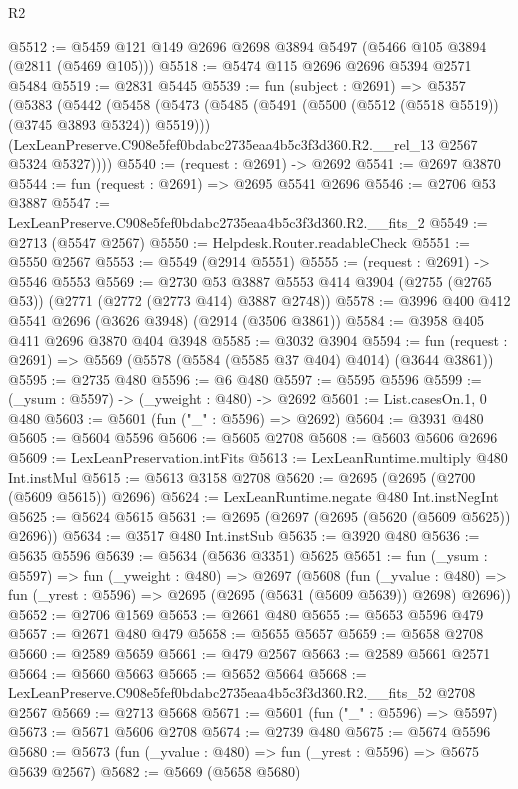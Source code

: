 \begin{lexlean}{R2}
\begin{coremodule}
@5512 := @5459 @121 @149 @2696 @2698 @3894 @5497 (@5466 @105 @3894 (@2811 (@5469 @105)))
@5518 := @5474 @115 @2696 @2696 @5394 @2571 @5484
@5519 := @2831 @5445
@5539 := fun (subject : @2691) =>
  @5357
    (@5383
      (@5442
        (@5458
          (@5473 (@5485 (@5491 (@5500 (@5512 (@5518 @5519)) (@3745 @3893 @5324)) @5519)))
          (LexLeanPreserve.C908e5fef0bdabc2735eaa4b5c3f3d360.R2.__rel_13 @2567 @5324 @5327))))
@5540 := (request : @2691) -> @2692
@5541 := @2697 @3870
@5544 := fun (request : @2691) => @2695 @5541 @2696
@5546 := @2706 @53 @3887
@5547 := LexLeanPreserve.C908e5fef0bdabc2735eaa4b5c3f3d360.R2.__fits_2
@5549 := @2713 (@5547 @2567)
@5550 := Helpdesk.Router.readableCheck
@5551 := @5550 @2567
@5553 := @5549 (@2914 @5551)
@5555 := (request : @2691) -> @5546 @5553
@5569 := @2730
    @53
    @3887
    @5553
    @414
    @3904
    (@2755 (@2765 @53))
    (@2771 (@2772 (@2773 @414) @3887 @2748))
@5578 := @3996 @400 @412 @5541 @2696 (@3626 @3948) (@2914 (@3506 @3861))
@5584 := @3958 @405 @411 @2696 @3870 @404 @3948
@5585 := @3032 @3904
@5594 := fun (request : @2691) => @5569 (@5578 (@5584 (@5585 @37 @404) @4014) (@3644 @3861))
@5595 := @2735 @480
@5596 := @6 @480
@5597 := @5595 @5596
@5599 := (_ysum : @5597) -> (_yweight : @480) -> @2692
@5601 := List.casesOn.{1, 0} @480
@5603 := @5601 (fun ("_" : @5596) => @2692)
@5604 := @3931 @480
@5605 := @5604 @5596
@5606 := @5605 @2708
@5608 := @5603 @5606 @2696
@5609 := LexLeanPreservation.intFits
@5613 := LexLeanRuntime.multiply @480 Int.instMul
@5615 := @5613 @3158 @2708
@5620 := @2695 (@2695 (@2700 (@5609 @5615)) @2696)
@5624 := LexLeanRuntime.negate @480 Int.instNegInt
@5625 := @5624 @5615
@5631 := @2695 (@2697 (@2695 (@5620 (@5609 @5625)) @2696))
@5634 := @3517 @480 Int.instSub
@5635 := @3920 @480
@5636 := @5635 @5596
@5639 := @5634 (@5636 @3351) @5625
@5651 := fun (_ysum : @5597) =>
  fun (_yweight : @480) =>
  @2697
    (@5608
      (fun (_yvalue : @480) =>
      fun (_yrest : @5596) => @2695 (@2695 (@5631 (@5609 @5639)) @2698) @2696))
@5652 := @2706 @1569
@5653 := @2661 @480
@5655 := @5653 @5596 @479
@5657 := @2671 @480 @479
@5658 := @5655 @5657
@5659 := @5658 @2708
@5660 := @2589 @5659
@5661 := @479 @2567
@5663 := @2589 @5661 @2571
@5664 := @5660 @5663
@5665 := @5652 @5664
@5668 := LexLeanPreserve.C908e5fef0bdabc2735eaa4b5c3f3d360.R2.__fits_52 @2708 @2567
@5669 := @2713 @5668
@5671 := @5601 (fun ("_" : @5596) => @5597)
@5673 := @5671 @5606 @2708
@5674 := @2739 @480
@5675 := @5674 @5596
@5680 := @5673 (fun (_yvalue : @480) => fun (_yrest : @5596) => @5675 @5639 @2567)
@5682 := @5669 (@5658 @5680)

\end{coremodule}
\end{lexlean}
